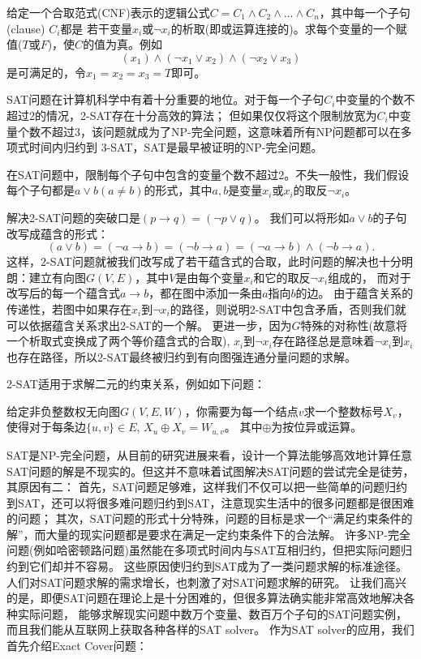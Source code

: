 \begin{prob}
 给定一个合取范式(CNF)表示的逻辑公式$C = C_1 \land C_2 \land \ldots \land C_n$，其中每一个子句(clause) $C_i$都是
 若干变量$x_i$或$\neg x_i$的析取(即或运算连接的)。求每个变量的一个赋值($T$或$F$)，使$C$的值为真。例如
 $$(x_1)\land(\neg x_1 \lor x_2)\land(\neg x_2 \lor x_3)$$
 是可满足的，令$x_1=x_2=x_3=T$即可。
\end{prob}

SAT问题在计算机科学中有着十分重要的地位。对于每一个子句$C_i$中变量的个数不超过2的情况，2-SAT存在十分高效的算法；
但如果仅仅将这个限制放宽为$C_i$中变量个数不超过3，该问题就成为了NP-完全问题，这意味着所有NP问题都可以在多项式时间内归约到
3-SAT，SAT是最早被证明的NP-完全问题。

\begin{prob}[2-SAT]
 在SAT问题中，限制每个子句中包含的变量个数不超过2。不失一般性，我们假设每个子句都是$a\lor b (a \neq b)$的形式，其中$a, b$是变量$x_i$或$x_i$的取反$\neg x_i$。
\end{prob}
\begin{solution}
解决2-SAT问题的突破口是$(p\to q) = (\neg p \lor q)$。
我们可以将形如$a\lor b$的子句改写成蕴含的形式：$$(a\lor b) = (\neg a \to b) = (\neg b \to a) = (\neg a \to b) \land (\neg b \to a).$$
这样，2-SAT问题就被我们改写成了若干蕴含式的合取，此时问题的解决也十分明朗：建立有向图$G(V,E)$，其中$V$是由每个变量$x_i$和它的取反$\neg x_i$组成的，
而对于改写后的每一个蕴含式$a\to b$，都在图中添加一条由$a$指向$b$的边。
由于蕴含关系的传递性，若图中如果存在$x_i$到$\neg x_i$的路径，则说明2-SAT中包含矛盾，否则我们就可以依据蕴含关系求出2-SAT的一个解。
更进一步，因为$G$特殊的对称性(故意将一个析取式变换成了两个等价蕴含式的合取), $x_i$到$\neg x_i$存在路径总是意味着$\neg x_i$到$x_i$也存在路径，所以2-SAT最终被归约到有向图强连通分量问题的求解。
\end{solution}

2-SAT适用于求解二元的约束关系，例如如下问题：
\begin{prob}
 给定非负整数权无向图$G(V, E, W)$，你需要为每一个结点$v$求一个整数标号$X_v$，使得对于每条边$\{u, v\}\in E$, $X_u \oplus X_v = W_{u,v}$。
 其中$\oplus$为按位异或运算。
\end{prob}

SAT是NP-完全问题，从目前的研究进展来看，设计一个算法能够高效地计算任意SAT问题的解是不现实的。但这并不意味着试图解决SAT问题的尝试完全是徒劳，其原因有二：
首先，SAT问题足够难，这样我们不仅可以把一些简单的问题归约到SAT，还可以将很多难问题归约到SAT，注意现实生活中的很多问题都是很困难的问题；
其次，SAT问题的形式十分特殊，问题的目标是求一个``满足约束条件的解''，而大量的现实问题都是要求在满足一定约束条件下的合法解。
许多NP-完全问题(例如哈密顿路问题)虽然能在多项式时间内与SAT互相归约，但把实际问题归约到它们却并不容易。
这些原因使归约到SAT成为了一类问题求解的标准途径。人们对SAT问题求解的需求增长，也刺激了对SAT问题求解的研究。
让我们高兴的是，即便SAT问题在理论上是十分困难的，但很多算法确实能非常高效地解决各种实际问题，
能够求解现实问题中数万个变量、数百万个子句的SAT问题实例，而且我们能从互联网上获取各种各样的SAT solver。
作为SAT solver的应用，我们首先介绍Exact Cover问题：

